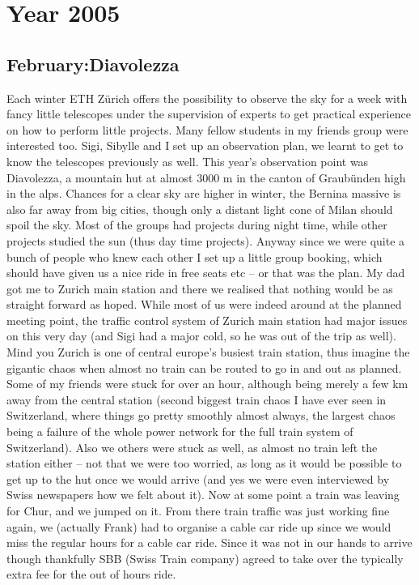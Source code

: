 \chapter{Year 2005}
\label{2005}

\section{February:Diavolezza}
\label{2005:Diavolezza}

Each winter ETH Z\"urich offers the possibility to observe the sky for a week with fancy little telescopes under the supervision of experts to get practical experience on how to perform little projects. Many fellow students in my friends group were interested too. Sigi, Sibylle and I set up an observation plan, we learnt to get to know the telescopes previously as well. This year's observation point was Diavolezza, a mountain hut at almost 3000 m in the canton of Graub\"unden high in the alps. Chances for a clear sky are higher in winter, the Bernina massive is also far away from big cities, though only a distant light cone of Milan should spoil the sky. Most of the groups had projects during night time, while other projects studied the sun (thus day time projects). Anyway since we were quite a bunch of people who knew each other I set up a little group booking, which should have given us a nice ride in free seats etc -- or that was the plan. My dad got me to Zurich main station and there we realised that nothing would be as straight forward as hoped. While most of us were indeed around at the planned meeting point, the traffic control system of Zurich main station had major issues on this very day (and Sigi had a major cold, so he was out of the trip as well). Mind you Zurich is one of central europe's busiest train station, thus imagine the gigantic chaos when almost no train can be routed to go in and out as planned. Some of my friends were stuck for over an hour, although being merely a few km away from the central station (second biggest train chaos I have ever seen in Switzerland, where things go pretty smoothly almost always, the largest chaos being a failure of the whole power network for the full train system of Switzerland). Also we others were stuck as well, as almost no train left the station either -- not that we were too worried, as long as it would be possible to get up to the hut once we would arrive (and yes we were even interviewed by Swiss newspapers how we felt about it). Now at some point a train was leaving for Chur, and we jumped on it. From there train traffic was just working fine again, we (actually Frank) had to organise a cable car ride up since we would miss the regular hours for a cable car ride. Since it was not in our hands to arrive though thankfully SBB (Swiss Train company) agreed to take over the typically extra fee for the out of hours ride.\\
